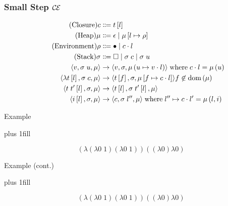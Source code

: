 \documentclass[14pt,mathserif]{beamer}
\def\ce{$\mathcal{\mathcal{C} \mskip -1mu \mathcal{E}} \mskip 4mu$}
\begin{document}
\begin{frame}[fragile]
\frametitle{Small Step \ce}
\footnotesize
\begin{align*}
\tag{Closure} c &\Coloneqq t \left[l\right] \\
\tag{Heap} \mu &\Coloneqq \epsilon \; | \; \mu \left[ l \mapsto \rho \right] \\
\tag{Environment} \rho &\Coloneqq \bullet \; | \; c \cdot l \\
\tag{Stack} \sigma &\Coloneqq \square \; | \; \sigma \; c \;  | \; \sigma \; u \\
\langle v,  \sigma \; u , \mu \rangle 
  &\rightarrow
\langle v, \sigma, \mu\left(u \mapsto v \cdot l\right) \rangle  
\; \textnormal{where} \; c \cdot l = \mu\left(u\right) \\
\langle \lambda t\left[l\right], \sigma \; c, \mu \rangle 
  &\rightarrow
\langle t\left[f\right], \sigma, \mu\left[f \mapsto c \cdot l\right]\rangle f
\not \in \textnormal{dom}\left(\mu\right)  \\
\langle t \; t'\left[l\right], \sigma, \mu \rangle
  &\rightarrow
\langle t\left[l\right], \sigma \; t'\left[l\right], \mu \rangle \\
\langle i\left[l\right], \sigma, \mu \rangle
  &\rightarrow
\langle c, \sigma \; l'', \mu \rangle
\; \textnormal{where} \; l'' \mapsto c \cdot l' = \mu\left(l, i\right)
\end{align*}
\end{frame}

\begin{frame}{Example}
\begin{center}
\vskip0pt plus 1fill
\end{center}
$$(\lambda (\lambda 0 \; 1) (\lambda 0 \; 1))((\lambda 0) \lambda 0)$$
\end{frame}

\begin{frame}{Example (cont.)}
\begin{center}
\vskip0pt plus 1fill
\end{center}
$$(\lambda (\lambda 0 \; 1) (\lambda 0 \; 1))((\lambda 0) \lambda 0)$$
\end{frame}
\end{document}
